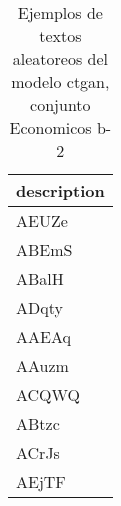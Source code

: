 \begin{table}[H]
\centering
\fontsize{8}{14}\selectfont
\caption{Ejemplos de textos aleatoreos del modelo ctgan, conjunto Economicos b-2}
\label{table-sample10-economicos-b-2-ctgan-text}
\begin{tabular}{|m{50em}|}
\hline
\rowcolor[gray]{0.8}
description \\
\hline AEUZe \\
\hline ABEmS \\
\hline ABalH \\
\hline ADqty \\
\hline AAEAq \\
\hline AAuzm \\
\hline ACQWQ \\
\hline ABtzc \\
\hline ACrJs \\
\hline AEjTF \\
\hline
\end{tabular}
\end{table}
